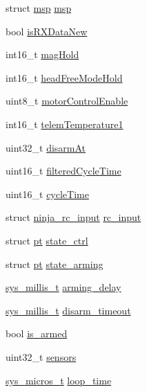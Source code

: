 \begin{DoxyCompactItemize}
\item 
struct \hyperlink{structmsp}{msp} \hyperlink{structninja_a56f4ff8bff5033e0140f6533594a81ee}{msp}
\item 
bool \hyperlink{structninja_a7218642d99e56ef60c055e703dc6b4a6}{is\+R\+X\+Data\+New}
\item 
int16\+\_\+t \hyperlink{structninja_aa63e6fd9f35abff9d2725684aa455a7f}{mag\+Hold}
\item 
int16\+\_\+t \hyperlink{structninja_a69f93c222881c9ad877cc8796cb3ee80}{head\+Free\+Mode\+Hold}
\item 
uint8\+\_\+t \hyperlink{structninja_af8efd0b7d763360c87635090d0c695b7}{motor\+Control\+Enable}
\item 
int16\+\_\+t \hyperlink{structninja_a34e33e47d1f66c97893be765ece89aaf}{telem\+Temperature1}
\item 
uint32\+\_\+t \hyperlink{structninja_a1760941a1a6ff6b25854efd6f0bdce4d}{disarm\+At}
\item 
uint16\+\_\+t \hyperlink{structninja_a0453972c0a34bad54ef15af43ccd9d30}{filtered\+Cycle\+Time}
\item 
uint16\+\_\+t \hyperlink{structninja_a36f7aa8b2d5dea192a529d2d64d32e88}{cycle\+Time}
\item 
struct \hyperlink{structninja__rc__input}{ninja\+\_\+rc\+\_\+input} \hyperlink{structninja_a1805a02bb889413e911c821b21fd3470}{rc\+\_\+input}
\item 
struct \hyperlink{structpt}{pt} \hyperlink{structninja_a17e28f0fc4b9027ccae23d6575abd9c4}{state\+\_\+ctrl}
\item 
struct \hyperlink{structpt}{pt} \hyperlink{structninja_aa1a183039a021e827be1869a92b5ee4a}{state\+\_\+arming}
\item 
\hyperlink{system__calls_8h_a62a9a2e72861132c17d4d4b29bb8b80a}{sys\+\_\+millis\+\_\+t} \hyperlink{structninja_a5b029648fc562a396801ec821f023425}{arming\+\_\+delay}
\item 
\hyperlink{system__calls_8h_a62a9a2e72861132c17d4d4b29bb8b80a}{sys\+\_\+millis\+\_\+t} \hyperlink{structninja_af1f7406a2e045b7cbc4ae7b7faa2cbcb}{disarm\+\_\+timeout}
\item 
bool \hyperlink{structninja_a6b6a60bbeca8854c0bf19fa222f6c4a9}{is\+\_\+armed}
\item 
uint32\+\_\+t \hyperlink{structninja_a978ed6b6ca928428db7481116e618b67}{sensors}
\item 
\hyperlink{system__calls_8h_a1374d627d8a03b6d9ebb6707c67cf2ff}{sys\+\_\+micros\+\_\+t} \hyperlink{structninja_a09180afc9ba2fb8369e371b62f61b74f}{loop\+\_\+time}

\end{DoxyCompactItemize}
